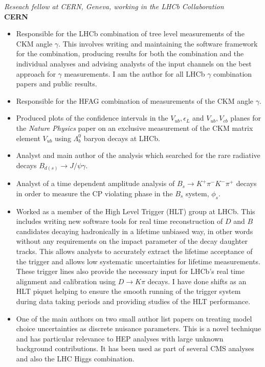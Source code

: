 \documentclass[margin, 10pt]{res} %
\begin{document}
\begin{resume}
{\sl Reseach fellow at CERN, Geneva, working in the LHCb Collaboration}\\
{\bf CERN}
\begin{itemize} \itemsep -2pt
\item Responsible for the LHCb combination of tree level measurements of the CKM angle $\gamma$. This involves writing and maintaining the software framework for the combination, producing results for both the combination and the individual analyses and advising analysts of the input channels on the best approach for $\gamma$ measurements. I am the author for all LHCb $\gamma$ combination papers and public results.
\item Responsible for the HFAG combination of measurements of the CKM angle $\gamma$.
\item Produced plots of the confidence intervals in the $V_{ub}, \epsilon_{L}$ and $V_{ub}, V_{cb}$ planes for the \textit{Nature Physics} paper on an exclusive measurement of the CKM matrix element $V_{ub}$ using $\Lambda_{b}^{0}$ baryon decays at LHCb.
\item Analyst and main author of the analysis which searched for the rare radiative decays $B_{d(s)}\rightarrow J/\psi \gamma$.
\item Analyst of a time dependent amplitude analysis of $B_{s}\rightarrow K^{+}\pi^{-}K^{-}\pi^{+}$ decays in order to measure
  the CP violating phase in the $B_{s}$ system, $\phi_{s}$.
\item Worked as a member of the High Level Trigger (HLT) group at LHCb. This includes writing new software tools for real time reconstruction of $D$ and $B$ candidates decaying hadronically in a lifetime unbiased way, in other words without any requirements on the impact parameter of the decay daughter tracks. This allows analysts to accurately extract the lifetime acceptance of the trigger and allows low systematic uncertainties for lifetime measurements. These trigger lines also provide the necessary input for LHCb's real time alignment and calibration using $D\rightarrow K\pi$ decays. I have done shifts as an HLT piquet helping to ensure the smooth running of the trigger system during data taking periods and providing studies of the HLT performance.
\item One of the main authors on two small author list papers on treating model choice uncertainties as discrete nuisance parameters. This is a novel technique and has particular relevance to HEP analyses with large unknown background contributions. It has been used as part of several CMS analyses and also the LHC Higgs combination.
\end{itemize}


\end{resume}
\end{document}
